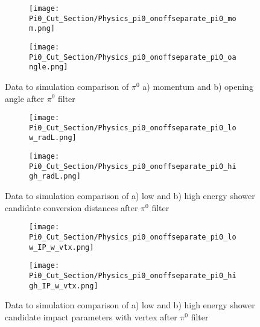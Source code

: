 \begin{figure}[H]
\centering
  \begin{subfigure}[t]{0.3\textwidth}
    \centering
\texttt{[image: Pi0\_Cut\_Section/Physics\_pi0\_onoffseparate\_pi0\_mom.png]}
  \caption{ }
  \end{subfigure} 
  \hspace{30mm}
  \begin{subfigure}[t]{0.3\textwidth}
    \centering
\texttt{[image: Pi0\_Cut\_Section/Physics\_pi0\_onoffseparate\_pi0\_oangle.png]} 
  \caption{ }
  \end{subfigure} 
\label{fig:physics_pi0_pi0_oangle}
\caption{ Data to simulation comparison of $\pi^0$ a) momentum and b) opening angle after $\pi^0$ filter }
\end{figure}

\begin{figure}[H]
\centering
  \begin{subfigure}[t]{0.3\textwidth}
    \centering
\texttt{[image: Pi0\_Cut\_Section/Physics\_pi0\_onoffseparate\_pi0\_low\_radL.png]}
  \caption{ }
  \end{subfigure} 
  \hspace{30mm}
  \begin{subfigure}[t]{0.3\textwidth}
    \centering
\texttt{[image: Pi0\_Cut\_Section/Physics\_pi0\_onoffseparate\_pi0\_high\_radL.png]}
  \caption{ }
  \end{subfigure} 
\label{fig:physics_pi0_pi0_rl}
\caption{ Data to simulation comparison of a) low and b) high energy shower candidate conversion distances  after $\pi^0$ filter }
\end{figure}

\begin{figure}[H]
\centering
  \begin{subfigure}[t]{0.3\textwidth}
    \centering
\texttt{[image: Pi0\_Cut\_Section/Physics\_pi0\_onoffseparate\_pi0\_low\_IP\_w\_vtx.png]}
  \caption{ }
  \end{subfigure} 
  \hspace{30mm}
  \begin{subfigure}[t]{0.3\textwidth}
    \centering
\texttt{[image: Pi0\_Cut\_Section/Physics\_pi0\_onoffseparate\_pi0\_high\_IP\_w\_vtx.png]}
  \caption{ }
  \end{subfigure} 
\label{fig:physics_pi0_pi0_IP_w_vtx}
\caption{ Data to simulation comparison of a) low and b) high energy shower candidate impact parameters with vertex after $\pi^0$ filter }
\end{figure}

